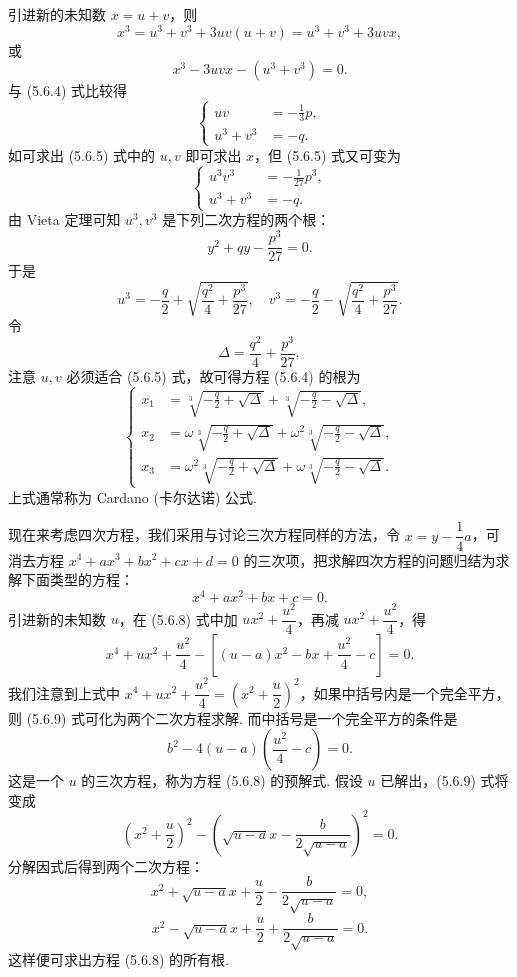 \documentclass[UTF8,12pt,a4paper,fontset=fandol]{ctexart}
\begin{document}
引进新的未知数 $x=u+v$，则
\[
x^3=u^3+v^3+3uv(u+v)=u^3+v^3+3uvx,
\]
或
\[
x^3-3uvx-(u^3+v^3)=0.
\]
与 (5.6.4) 式比较得
\begin{equation}
\left\{
\begin{aligned}
uv&=-\frac13p,\\
u^3+v^3&=-q.
\end{aligned}
\right.
\tag{5.6.5}
\end{equation}
如可求出 (5.6.5) 式中的 $u,v$ 即可求出 $x$，但 (5.6.5) 式又可变为
\begin{equation}
\left\{
\begin{aligned}
u^3v^3&=-\frac1{27}p^3,\\
u^3+v^3&=-q.
\end{aligned}
\right.
\tag{5.6.6}
\end{equation}
由 Vieta 定理可知 $u^3,v^3$ 是下列二次方程的两个根：
\[
y^2+qy-\frac{p^3}{27}=0.
\]
于是
\[
u^3=-\frac q2+\sqrt{\frac{q^2}{4}+\frac{p^3}{27}},\quad
v^3=-\frac q2-\sqrt{\frac{q^2}{4}+\frac{p^3}{27}}.
\]
令
\[
\Delta=\frac{q^2}{4}+\frac{p^3}{27},
\]
注意 $u,v$ 必须适合 (5.6.5) 式，故可得方程 (5.6.4) 的根为
\begin{equation}
\left\{
\begin{aligned}
x_1&=\sqrt[3]{-\frac q2+\sqrt{\Delta}}+\sqrt[3]{-\frac q2-\sqrt{\Delta}},\\
x_2&=\omega\sqrt[3]{-\frac q2+\sqrt{\Delta}}+\omega^2\sqrt[3]{-\frac q2-\sqrt{\Delta}},\\
x_3&=\omega^2\sqrt[3]{-\frac q2+\sqrt{\Delta}}+\omega\sqrt[3]{-\frac q2-\sqrt{\Delta}}.
\end{aligned}
\right.
\tag{5.6.7}
\end{equation}
上式通常称为 Cardano (卡尔达诺) 公式.

现在来考虑四次方程，我们采用与讨论三次方程同样的方法，令 $x=y-\dfrac14a$，可消去方程 $x^4+ax^3+bx^2+cx+d=0$ 的三次项，把求解四次方程的问题归结为求解下面类型的方程：
\begin{equation}
x^4+ax^2+bx+c=0.
\tag{5.6.8}
\end{equation}
引进新的未知数 $u$，在 (5.6.8) 式中加 $ux^2+\dfrac{u^2}{4}$，再减 $ux^2+\dfrac{u^2}{4}$，得
\begin{equation}
x^4+ux^2+\frac{u^2}{4}-\left[(u-a)x^2-bx+\frac{u^2}{4}-c\right]=0.
\tag{5.6.9}
\end{equation}
我们注意到上式中 $x^4+ux^2+\dfrac{u^2}{4}=\left(x^2+\dfrac{u}{2}\right)^2$，如果中括号内是一个完全平方，则 (5.6.9) 式可化为两个二次方程求解. 而中括号是一个完全平方的条件是
\begin{equation}
b^2-4(u-a)\left(\frac{u^2}{4}-c\right)=0.
\tag{5.6.10}
\end{equation}
这是一个 $u$ 的三次方程，称为方程 (5.6.8) 的预解式. 假设 $u$ 已解出，(5.6.9) 式将变成
\[
\left(x^2+\frac u2\right)^2-\left(\sqrt{u-a}x-\frac{b}{2\sqrt{u-a}}\right)^2=0.
\]
分解因式后得到两个二次方程：
\begin{equation}
x^2+\sqrt{u-a}x+\frac u2-\frac{b}{2\sqrt{u-a}}=0,
\tag{5.6.11}
\end{equation}
\begin{equation}
x^2-\sqrt{u-a}x+\frac u2+\frac{b}{2\sqrt{u-a}}=0.
\tag{5.6.12}
\end{equation}
这样便可求出方程 (5.6.8) 的所有根.
\end{document}
